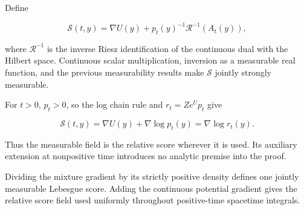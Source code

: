 \documentclass[11pt,a4paper]{article}
\begin{document}
Define

\[\mathcal S(t,y)=\nabla U(y)+p_t(y)^{-1}\mathcal R^{-1}(A_t(y)),\]

where \(\mathcal R^{-1}\) is the inverse Riesz identification of the continuous dual with the Hilbert space. Continuous scalar multiplication, inversion as a measurable real function, and the previous measurability results make \(\mathcal S\) jointly strongly measurable.



For \(t>0\), \(p_t>0\), so the log chain rule and \(r_t=Z e^U p_t\) give

\[\mathcal S(t,y)=\nabla U(y)+\nabla\log p_t(y)=\nabla\log r_t(y).\]

Thus the measurable field is the relative score wherever it is used. Its auxiliary extension at nonpositive time introduces no analytic premise into the proof.



Dividing the mixture gradient by its strictly positive density defines one jointly measurable Lebesgue score. Adding the continuous potential gradient gives the relative score field used uniformly throughout positive-time spacetime integrals.
\end{document}
